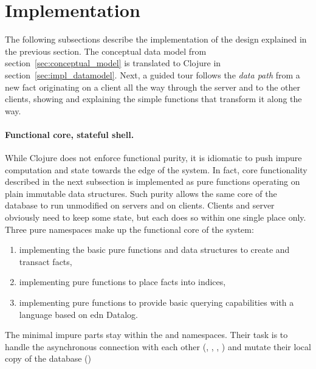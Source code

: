 \section{Implementation}\label{sec:implementation}

The following subsections describe the implementation of the design explained in the previous section. The conceptual data model from section~\ref{sec:conceptual_model} is translated to Clojure in section~\ref{sec:impl_datamodel}. Next, a guided tour follows the \emph{data path} from a new fact originating on a client all the way through the server and to the other clients, showing and explaining the simple functions that transform it along the way.

\paragraph{Functional core, stateful shell.}
While Clojure does not enforce functional purity, it is idiomatic to push impure computation and state towards the edge of the system. In fact, core functionality described in the next subsection is implemented as pure functions operating on plain immutable data structures. Such purity allows the same core of the database to run unmodified on servers and on clients. Clients and server obviously need to keep some state, but each does so within one single place only. Three pure namespaces make up the functional core of the system:

\begin{enumerate}[label={(\roman*)}]
  \item {} implementing the basic pure functions and data structures to create and transact facts,
  \item {} implementing pure functions to place facts into indices,
  \item {} implementing pure functions to provide basic querying capabilities with a language based on edn Datalog.
\end{enumerate}

The minimal impure parts stay within the  and  namespaces. Their task is to handle the asynchronous connection with each other (, , , ) and mutate their local copy of the database ()


